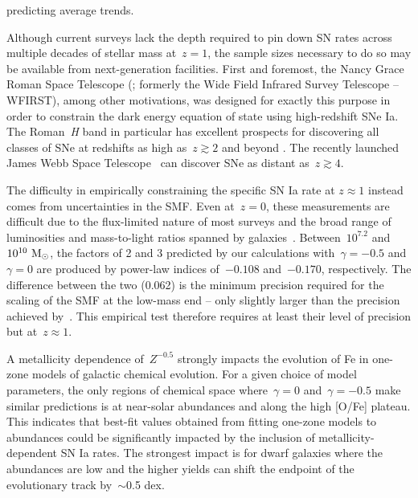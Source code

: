 \documentclass[ms.tex]{subfiles}
\begin{document}
predicting average trends.
\par
Although current surveys lack the depth required to pin down SN rates across
multiple decades of stellar mass at~$z = 1$, the sample sizes necessary to do
so may be available from next-generation facilities.
First and foremost, the Nancy Grace Roman Space Telescope (\citealp{Spergel2013,
Spergel2015}; formerly the Wide Field Infrared Survey Telescope -- WFIRST),
among other motivations, was designed for exactly this purpose in order to
constrain the dark energy equation of state using high-redshift SNe Ia.
The Roman~\textit{H} band in particular has excellent prospects for discovering
all classes of SNe at redshifts as high as~$z \gtrsim 2$ and beyond
\citep{Petrushevska2016}.
The recently launched James Webb Space Telescope~\citep[JWST;][]{Gardner2006}
can discover SNe as distant as~$z \gtrsim 4$.
\par
The difficulty in empirically constraining the specific SN Ia rate at
$z \approx 1$ instead comes from uncertainties in the SMF.
Even at~$z = 0$, these measurements are difficult due to the flux-limited
nature of most surveys and the broad range of luminosities and mass-to-light
ratios spanned by galaxies~\citep[see the discussion in][]{Weigel2016}.
Between~$10^{7.2}$ and~$10^{10}~\text{M}_\odot$, the factors of 2 and 3 predicted by our
calculations with~$\gamma = -0.5$ and $\gamma = 0$ are produced by power-law
indices of~$-0.108$ and~$-0.170$, respectively.
The difference between the two (0.062) is the minimum precision required for
the scaling of the SMF at the low-mass end -- only slightly larger than the
precision achieved by~\citet[][$\pm 0.05$, see their Fig. 13]{Baldry2012}.
This empirical test therefore requires at least their level of precision but
at~$z \approx 1$.
\par
A metallicity dependence of~$Z^{-0.5}$ strongly impacts the evolution of Fe
in one-zone models of galactic chemical evolution.
For a given choice of model parameters, the only regions of chemical space
where~$\gamma = 0$ and~$\gamma = -0.5$ make similar predictions is at
near-solar abundances and along the high [O/Fe] plateau.
This indicates that best-fit values obtained from fitting one-zone models to
abundances could be significantly impacted by the inclusion of
metallicity-dependent SN Ia rates.
The strongest impact is for dwarf galaxies where the abundances are low and
the higher yields can shift the endpoint of the evolutionary track by~$\sim$0.5
dex.
\end{document}
